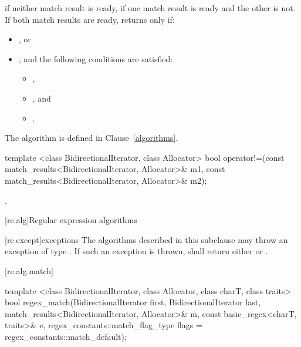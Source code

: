 \begin{itemdescr}
\pnum
\returns
{} if neither match result is ready,  if one match result is ready and the
other is not. If both match results are ready, returns  only if:

\begin{itemize}
\item
{}, or

\item
{}, and the following conditions are satisfied:

\begin{itemize}
\item
{},

\item
{}, and

\item
{}.
\end{itemize}
\end{itemize}
\enternote The algorithm  is defined in Clause~\ref{algorithms}. \exitnote
\end{itemdescr}

%
%
\begin{itemdecl}
template <class BidirectionalIterator, class Allocator>
bool operator!=(const match_results<BidirectionalIterator, Allocator>& m1,
                const match_results<BidirectionalIterator, Allocator>& m2);
\end{itemdecl}

\begin{itemdescr}
\pnum
\returns {}.
\end{itemdescr}

[re.alg]{Regular expression algorithms}

[re.except]{exceptions}
\pnum
The algorithms described in this subclause may throw an exception
of type . If such an exception  is thrown,
 shall return either 
or .

[re.alg.match]{}
%
\begin{itemdecl}
template <class BidirectionalIterator, class Allocator, class charT, class traits>
  bool regex_match(BidirectionalIterator first, BidirectionalIterator last,
                   match_results<BidirectionalIterator, Allocator>& m,
                   const basic_regex<charT, traits>& e,
                   regex_constants::match_flag_type flags =
                     regex_constants::match_default);
\end{itemdecl}

